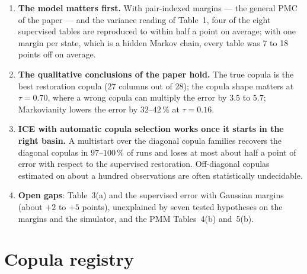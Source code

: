 \documentclass[11pt,a4paper]{article}
\begin{document}
\begin{enumerate}
  \item \textbf{The model matters first.} With pair-indexed margins --- the
        general PMC of the paper --- and the variance reading of Table~1,
        four of the eight supervised tables are reproduced to within half a
        point on average; with one margin per state, which is a hidden Markov
        chain, every table was 7 to 18 points off on average.
  \item \textbf{The qualitative conclusions of the paper hold.} The true
        copula is the best restoration copula (27 columns out of 28); the copula shape matters at
        $\tau=0.70$, where a wrong copula can multiply the error by $3.5$ to
        $5.7$; Markovianity lowers the error by $32$--$42\,\%$ at
        $\tau=0.16$.
  \item \textbf{ICE with automatic copula selection works once it starts in
        the right basin.} A multistart over the diagonal copula families
        recovers the diagonal copulas in $97$--$100\,\%$ of runs and loses at
        most about half a point of error with respect to the supervised
        restoration. Off-diagonal copulas estimated on about a hundred
        observations are often statistically undecidable.
  \item \textbf{Open gaps}: Table~3(a) and the supervised error with Gaussian
        margins (about $+2$ to $+5$ points), unexplained by seven tested
        hypotheses on the margins and the simulator, and the PMM
        Tables~4(b) and~5(b).
\end{enumerate}

\appendix
\section{Copula registry}\label{app:copulas}
\end{document}
